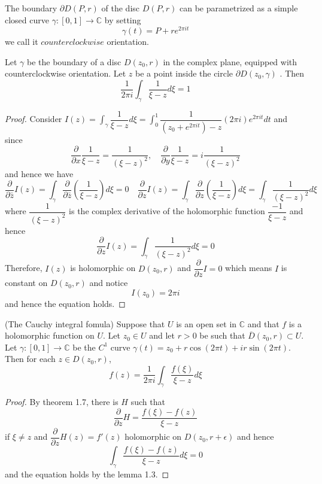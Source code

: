 \documentclass[lang=en, color=blue, ]{elegantbook}
\newcommand{\C}{\mathbb{C}}
\newcommand{\ParZ}{\dfrac{\partial}{\partial z}}
\newcommand{\ParbZ}{\dfrac{\partial}{\partial \bar{z}}}
\newcommand{\ParX}{\dfrac{\partial}{\partial x}}
\newcommand{\ParY}{\dfrac{\partial}{\partial y}}
\begin{document}
\begin{definition}
    The boundary $\partial D(P,r)$ of the disc $D(P,r)$ can be parametrized as a simple closed curve $\gamma:[0,1]\to \C$ by setting
    \[\gamma(t) = P+re^{2\pi it}\]
    we call it $counterclockwise$ orientation.
\end{definition}

\begin{lemma}
    Let $\gamma$ be the boundary of a disc $D(z_0,r)$ in the complex plane, equipped with counterclockwise orientation. Let $z$ be a point inside the circle $\partial D(z_0,\gamma)$ . Then
    \[\dfrac{1}{2\pi i} \int_{\gamma} \dfrac{1}{\xi-z}d\xi = 1\]
\end{lemma}
\begin{proof}\par
    Consider $I(z) = \int_{\gamma} \dfrac{1}{\xi-z}d\xi = \int_0^1 \dfrac{1}{(z_0+e^{2\pi it})-z}(2\pi i)e^{2\pi i t}dt$ and since
    \[\ParX \dfrac{1}{\xi-z} = \dfrac{1}{(\xi-z)^2},\quad \ParY \dfrac{1}{\xi -z} = i\dfrac{1}{(\xi-z)^2}\]
    and hence we have
    \[\ParbZ I(z) = \int_{\gamma} \ParbZ(\dfrac{1}{\xi-z})d\xi = 0\quad \ParZ I(z) = \int_{\gamma} \ParZ (\dfrac{1}{\xi-z})d\xi = \int_{\gamma}\dfrac{1}{(\xi-z)^2} d\xi\]
    where $\dfrac{1}{(\xi-z)^2}$ is the complex derivative of the holomorphic function $\dfrac{-1}{\xi-z}$ and hence 
    \[\ParZ I(z) = \int_{\gamma} \dfrac{1}{(\xi-z)^2}d\xi = 0\]
    Therefore, $I(z)$ is holomorphic on $D(z_0,r)$ and $\ParZ I = 0$ which means $I$ is constant on $D(z_0,r)$ and notice
    \[I(z_0) = 2\pi i\]
    and hence the equation holds.
\end{proof}

\begin{theorem}
    (The Cauchy integral fomula) Suppose that $U$ is an open set in $\C$ and that $f$ is a holomorphic function on $U$. Let $z_0\in U$ and let $r>0$ be such that $\overline{D}(z_0,r) \subset U$. Let $\gamma:[0,1] \to \C$ be the $C^1$ curve $\gamma(t)= z_0+r\cos(2\pi t) + ir \sin(2\pi t)$. Then for each $z\in D(z_0,r)$,
    \[f(z) = \dfrac{1}{2\pi i}\int_{\gamma} \dfrac{f(\xi)}{\xi-z}d\xi\] 
\end{theorem}
\begin{proof}
    By theorem 1.7, there is $H$ such that
    \[\ParZ H = \dfrac{f(\xi)-f(z)}{\xi-z}\]
    if $\xi \neq z$ and $\ParZ H(z) = f'(z)$ holomorphic on $D(z_0,r+\epsilon)$ and hence
    \[\int_{\gamma} \dfrac{f(\xi)-f(z)}{\xi-z}d\xi = 0\]
    and the equation holds by the lemma 1.3.
\end{proof}
\end{document}
